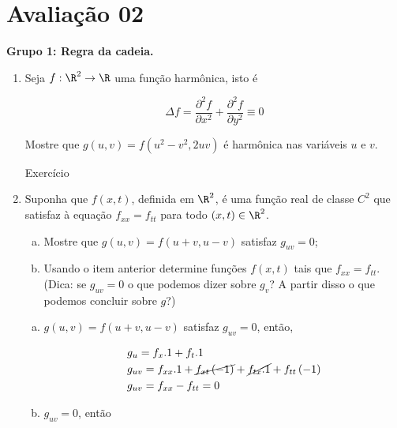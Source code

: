 \documentclass[11pt, oneside, a4paper]{gsm-l}
\begin{document}
\newpage

\section{Avalia\c{c}ão 02} \label{secP2}

\textbf{Grupo 1: Regra da cadeia.}

\begin{enumerate}
  \item Seja $f:\R^2 \to \R$ uma fun\c{c}ão harm\^onica, isto é

\[
\Delta f = \frac{{\partial ^2 f}}
{{\partial x^2 }} + \frac{{\partial ^2 f}}
{{\partial y^2 }} \equiv 0
\]

Mostre que $g\left( {u,v} \right) = f\left( {u^2  - v^2 ,2uv} \right)$ é harm\^onica nas variáveis $u$ e $v$.

\begin{sol}
Exercício
\end{sol}

  \item Suponha que $f(x,t)$, definida em $\R^2$, é uma fun\c{c}ão real de classe $C^2$ que satisfaz \`a equa\c{c}ão $f_{xx} = f_{tt}$ para todo $(x,t) \in \R^2$.

  \begin{enumerate}[(a)]
    \item Mostre que $g\left( {u,v} \right) = f\left( {u + v,u - v} \right)$ satisfaz $g_{uv} = 0$;
    \item Usando o item anterior determine funções $f(x,t)$ tais que $f_{xx} = f_{tt}$. (Dica: se $g_{uv} = 0$ o que podemos dizer sobre $g_v$? A partir disso o que podemos concluir sobre $g$?)
  \end{enumerate}

\begin{sol}
  \begin{enumerate}[(a)]
    \item $g\left( {u,v} \right) = f\left( {u + v,u - v} \right)$ satisfaz $g_{uv} = 0$, então,

\[
\begin{gathered}
  g_u  = f_x .1 + f_t .1 \hfill \\
  g_{uv}  = f_{xx} .1 + \cancel{f_{xt} \left( { - 1} \right)} + \cancel{f_{tx} .1} + f_{tt} \left( { - 1} \right) \hfill \\
  g_{uv}  = f_{xx}  - f_{tt}  = 0 \hfill \\
\end{gathered}
\]


    \item $g_{uv} = 0$, então


\end{enumerate}
\end{sol}
\end{enumerate}
\end{document}
